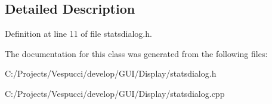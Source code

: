 \subsection{Detailed Description}


Definition at line 11 of file statsdialog.\+h.



The documentation for this class was generated from the following files\+:\begin{DoxyCompactItemize}
\item 
C\+:/\+Projects/\+Vespucci/develop/\+G\+U\+I/\+Display/statsdialog.\+h\item 
C\+:/\+Projects/\+Vespucci/develop/\+G\+U\+I/\+Display/statsdialog.\+cpp\end{DoxyCompactItemize}
